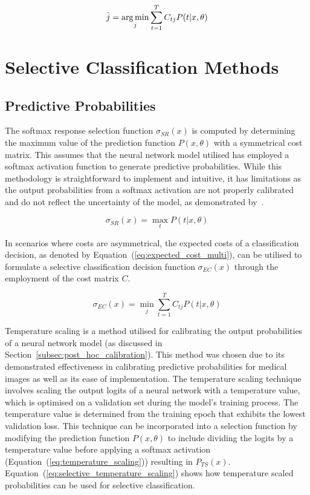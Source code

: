 \begin{equation}
	\hat{j} = \operatorname*{arg\,min}_j\sum^T_{t=1}C_{tj}P(t|x,\theta)
	\label{eq:expected_cost_multi}
\end{equation}



\section{Selective Classification Methods}
\label{sec:slective_classification_methods}

\subsection{Predictive Probabilities}
\label{subsec:selective_predictive_probabilites}
The softmax response selection function $\sigma_{SR}(x)$ is computed by determining the maximum value of the prediction function $P(x, \theta)$ with a symmetrical cost matrix. This assumes that the neural network model utilised has employed a softmax activation function to generate predictive probabilities. While this methodology is straightforward to implement and intuitive, it has limitations as the output probabilities from a softmax activation are not properly calibrated and do not reflect the uncertainty of the model, as demonstrated by~\cite{gal2016dropout}.

\begin{equation}
	\sigma_{SR}(x) = \max_tP(t|x,\theta)
	\label{eq:softmax_response}
\end{equation}

\noindent In scenarios where costs are asymmetrical, the expected costs of a classification decision, as denoted by Equation~(\ref{eq:expected_cost_multi}), can be utilised to formulate a selective classification decision function $\sigma_{EC}(x)$ through the employment of the cost matrix $C$. 

\begin{equation}
	\sigma_{EC}(x) = \min_j\sum^T_{t=1}C_{tj}P(t|x,\theta)
	\label{eq:expected_cost_scoring}
\end{equation}

Temperature scaling is a method utilised for calibrating the output probabilities of a neural network model (as discussed in Section~\ref{subsec:post_hoc_calibration}). This method was chosen due to its demonstrated effectiveness in calibrating predictive probabilities for medical images as well as its ease of implementation. The temperature scaling technique involves scaling the output logits of a neural network with a temperature value, which is optimised on a validation set during the model's training process. The temperature value is determined from the training epoch that exhibits the lowest validation loss. This technique can be incorporated into a selection function by modifying the prediction function $P(x, \theta)$ to include dividing the logits by a temperature value before applying a softmax activation (Equation~(\ref{eq:temperature_scaling})) resulting in $P_{TS}(x)$. Equation~(\ref{eq:selective_temperature_scaling}) shows how temperature scaled probabilities can be used for selective classification.

